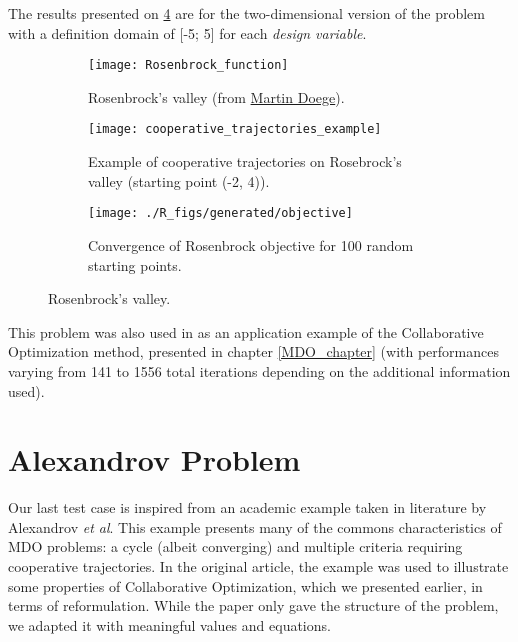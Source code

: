 The results presented on \figurename{} \ref{rosenbrock_res} are for the two-dimensional version of the problem with a definition domain of [-5; 5] for each \emph{design variable}.

\begin{figure}
\centering
	\begin{subfigure}{0.45\textwidth}
		\texttt{[image: Rosenbrock\_function]}
		\caption{Rosenbrock's valley (from \href{http://commons.wikimedia.org/wiki/File:Rosenbrock_function.svg}{Martin Doege}).}\label{rosenbrock_plot}
	\end{subfigure}
	\hfill%
	\begin{subfigure}{0.45\textwidth}	
		\centering
		\texttt{[image: cooperative\_trajectories\_example]}
		\caption{Example of cooperative trajectories on Rosebrock's valley (starting point (-2, 4)).}\label{collective_traj_rosenbrock_plot}
	\end{subfigure}
	
	\begin{subfigure}{0.4\textwidth}
		\centering
		\texttt{[image: ./R\_figs/generated/objective]}	
		\caption{Convergence of Rosenbrock objective for 100 random starting points.}\label{rosenbrock_res}
	\end{subfigure}
\caption{Rosenbrock's valley.}
\end{figure}

This problem was also used in \cite{Ilan:1994:MOM:887207} as an application example of the Collaborative Optimization method, presented in chapter \ref{MDO_chapter} (with performances varying from 141 to 1556 total iterations depending on the additional information used).

\section{Alexandrov Problem}

Our last test case is inspired from an academic example taken in literature by Alexandrov \emph{et al}\cite{alexandrov2002analytical}. This example presents many of the commons characteristics of MDO problems: a cycle (albeit converging) and multiple criteria requiring cooperative trajectories. In the original article, the example was used to illustrate some properties of Collaborative Optimization, which we presented earlier, in terms of reformulation. While the paper only gave the structure of the problem, we adapted it with meaningful values and equations.

